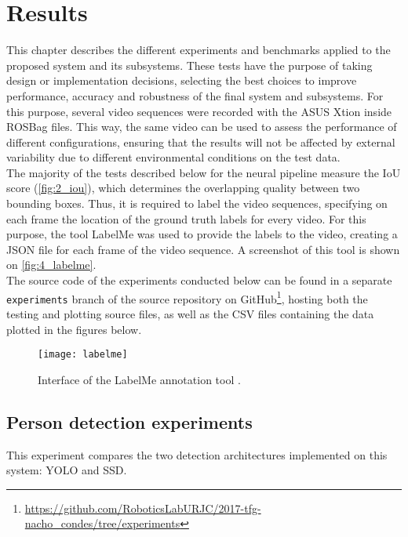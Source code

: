 \chapter{Results}
\label{chap:4_results}

This chapter describes the different experiments and benchmarks applied to the proposed system and its subsystems. These tests have the purpose of taking design or implementation decisions, selecting the best choices to improve performance, accuracy and robustness of the final system and subsystems. For this purpose, several video sequences were recorded with the ASUS Xtion inside ROSBag files. This way, the same video can be used to assess the performance of different configurations, ensuring that the results will not be affected by external variability due to different environmental conditions on the test data.\\

The majority of the tests described below for the neural pipeline measure the IoU score (\autoref{fig:2_iou}), which determines the overlapping quality between two bounding boxes. Thus, it is required to label the video sequences, specifying on each frame the location of the ground truth labels for every video. For this purpose, the tool LabelMe \cite{labelme} was used to provide the labels to the video, creating a JSON file for each frame of the video sequence. A screenshot of this tool is shown on \autoref{fig:4_labelme}.\\

The source code of the experiments conducted below can be found in a separate \texttt{experiments} branch of the source repository on GitHub\footnote{\url{https://github.com/RoboticsLabURJC/2017-tfg-nacho_condes/tree/experiments}}, hosting both the testing and plotting source files, as well as the CSV files containing the data plotted in the figures below.


\begin{figure}[h]
	\centering
	\texttt{[image: labelme]}
	\caption{Interface of the LabelMe annotation tool \cite{labelme}.}
	\label{fig:4_labelme}
\end{figure}


\section{Person detection experiments}
\label{sec:4_test1}
This experiment compares the two detection architectures implemented on this system: YOLO \cite{yolov3} and SSD\cite{ssd}.


